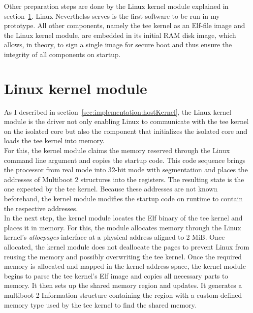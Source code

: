 Other preparation steps are done by the Linux kernel module explained in
section~\ref{sec:implementation:kmod}. Linux Neverthelss serves is the first
software to be run in my prototype. All other components, namely the \gls{tee}
kernel as an Elf-file image and the Linux kernel module, are embedded in its
initial RAM disk image, which allows, in theory, to sign a single image for
secure boot and thus ensure the integrity of all components on startup.\\

\section{Linux kernel module}
\label{sec:implementation:kmod}
As I described in section~\ref{sec:implementation:hostKernel}, the Linux kernel
module is the driver not only enabling Linux to communicate with the \gls{tee}
kernel on the isolated core but also the component that initializes the isolated
core and loads the \gls{tee} kernel into memory.\\

For this, the kernel module claims the memory reserved through the Linux command
line argument and copies the startup code. This code sequence brings the
processor from real mode into 32-bit mode with segmentation and places the
addresses of Multiboot 2 structures into the registers. The resulting state is
the one expected by the \gls{tee} kernel. Because these addresses are not known
beforehand, the kernel module modifies the startup code on runtime to contain
the respective addresses.\\

In the next step, the kernel module locates the Elf binary of the \gls{tee}
kernel and places it in memory. For this, the module allocates memory through
the Linux kernel's \textit{allocpages} interface at a physical address aligned
to 2 MiB. Once allocated, the kernel module does not deallocate the pages to
prevent Linux from reusing the memory and possibly overwriting the \gls{tee}
kernel. Once the required memory is allocated and mapped in the kernel address
space, the kernel module begins to parse the \gls{tee} kernel's Elf image and
copies all necessary parts to memory. It then sets up the shared memory region
and updates. It generates a multiboot 2 Information structure containing the
region with a custom-defined memory type used by the \gls{tee} kernel to find
the shared memory.\\

